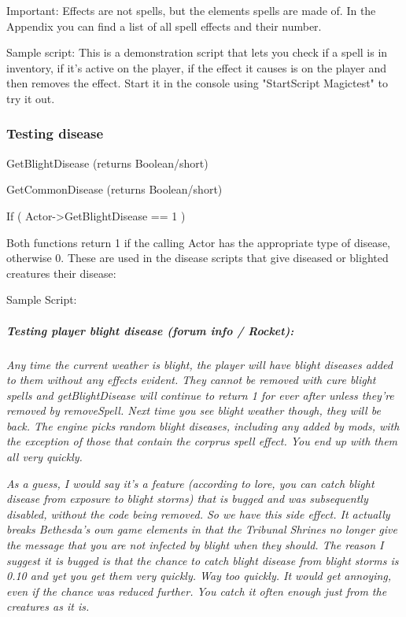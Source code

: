 Important: Effects are not spells, but the elements spells are made of.
In the Appendix you can find a list of all spell effects and their
number.

Sample script: This is a demonstration script that lets you check if a
spell is in inventory, if it's active on the player, if the effect it
causes is on the player and then removes the effect. Start it in the
console using "StartScript Magictest" to try it out.



\hypertarget{testing-disease}{%
\subsubsection{Testing disease}\label{testing-disease}}

GetBlightDisease (returns Boolean/short)

GetCommonDisease (returns Boolean/short)

If ( Actor-\textgreater GetBlightDisease == 1 )

Both functions return 1 if the calling Actor has the appropriate type of
disease, otherwise 0. These are used in the disease scripts that give
diseased or blighted creatures their disease:

Sample Script:



\hypertarget{testing-player-blight-disease-forum-info-rocket}{%
\subparagraph{Testing player blight disease (forum info /
Rocket):}\label{testing-player-blight-disease-forum-info-rocket}}

\emph{Any time the current weather is blight, the player will have
blight diseases added to them without any effects evident. They cannot
be removed with cure blight spells and getBlightDisease will continue to
return 1 for ever after unless they're removed by removeSpell. Next time
you see blight weather though, they will be back. The engine picks
random blight diseases, including any added by mods, with the exception
of those that contain the corprus spell effect. You end up with them all
very quickly.}

\emph{As a guess, I would say it's a feature (according to lore, you can
catch blight disease from exposure to blight storms) that is bugged and
was subsequently disabled, without the code being removed. So we have
this side effect. It actually breaks Bethesda's own game elements in
that the Tribunal Shrines no longer give the message that you are not
infected by blight when they should. The reason I suggest it is bugged
is that the chance to catch blight disease from blight storms is 0.10
and yet you get them very quickly. Way too quickly. It would get
annoying, even if the chance was reduced further. You catch it often
enough just from the creatures as it is.}

